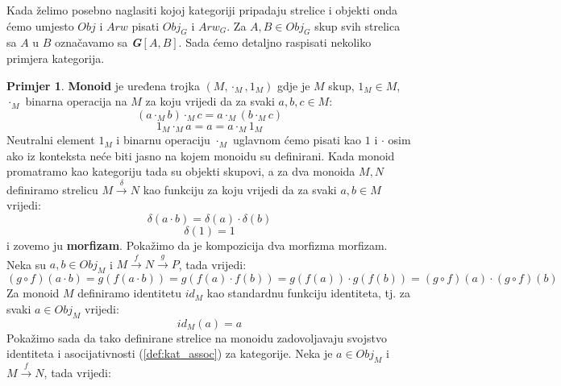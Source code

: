 \documentclass[11pt]{article}
\newcommand{\category}[1]{\textbf{\emph{#1}}}
\theoremstyle{definition}
\newtheorem{primjer}{Primjer}
\begin{document}
  Kada želimo posebno naglasiti kojoj kategoriji pripadaju strelice i objekti
  onda ćemo umjesto $Obj$ i $Arw$ pisati $Obj_G$ i $Arw_G$.
  Za $A, B \in Obj_G$ skup svih strelica sa $A$ u $B$ označavamo sa
  \category{G}$[A, B]$.
  Sada ćemo detaljno raspisati nekoliko primjera kategorija.

  \begin{primjer}
    \textbf{Monoid} je uređena trojka $(M, \cdot_M, 1_M)$ gdje je $M$ skup, $1_M
    \in M$, $\cdot_M$ binarna operacija na $M$ za koju vrijedi da za svaki $a, b, c \in M$:
    \begin{equation*}
      (a \cdot_M b) \cdot_M c = a \cdot_M (b \cdot_M c)
    \end{equation*}
    \begin{equation*}
      1_M \cdot_M a = a = a \cdot_M 1_M
    \end{equation*}
    Neutralni element $1_M$ i binarnu operaciju $\cdot_M$ uglavnom ćemo pisati
    kao $1$ i $\cdot$ osim ako iz konteksta neće biti jasno na kojem monoidu
    su definirani.
    Kada monoid promatramo kao kategoriju tada su objekti skupovi, a
    za dva monoida $M, N$ definiramo strelicu $M \xrightarrow{\delta} N$ kao
    funkciju za koju vrijedi da za svaki $a, b \in M$ vrijedi:
    \begin{equation*}
      \delta(a \cdot b) = \delta(a) \cdot \delta(b)
    \end{equation*}
    \begin{equation*}
      \delta(1) = 1
    \end{equation*}
    i zovemo ju \textbf{morfizam}.
    Pokažimo da je kompozicija dva morfizma morfizam.
    Neka su $a, b \in Obj_M$ i $M \xrightarrow{f} N \xrightarrow{g} P$, tada vrijedi:
    \begin{equation*}
      (g \circ f)(a \cdot b) = g(f(a \cdot b)) = g(f(a) \cdot f(b)) = g(f(a))
      \cdot g(f(b)) = (g \circ f)(a) \cdot (g \circ f)(b)
    \end{equation*}
    Za monoid $M$ definiramo identitetu $id_M$ kao standardnu funkciju
    identiteta, tj. za svaki $a \in Obj_M$ vrijedi:
    \begin{equation*}
      id_M(a) = a
    \end{equation*}
    Pokažimo sada da tako definirane strelice na monoidu zadovoljavaju
    svojstvo identiteta i asocijativnosti (\ref{def:kat_assoc}) za kategorije.
    Neka je $a \in Obj_M$ i $M \xrightarrow{f} N$, tada vrijedi:
    \begin{equation*}

\end{equation*}
\end{primjer}
\end{document}

